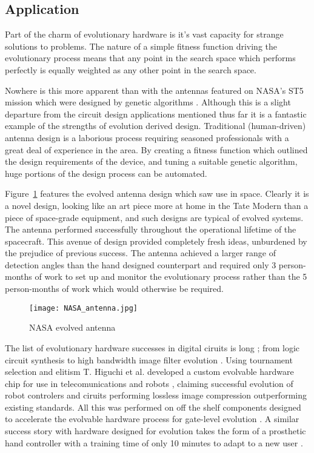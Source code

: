 \subsection{Application}

Part of the charm of evolutionary hardware is it's vast capacity for strange
solutions
to problems. The nature of a simple fitness function driving the evolutionary
process means that any point in the search space which performs perfectly is
equally weighted as any other point in the search space.

Nowhere is this more apparent than with the antennas featured on NASA's ST5 mission
which were designed by genetic algorithms \cite{Antenna}. Although
this is a slight departure from the circuit design applications mentioned thus
far it is a fantastic example of the strengths of evolution derived design.
Traditional (human-driven) antenna design is a laborious process requiring
seasoned professionals with a great deal of experience in the area. By creating
a fitness function which outlined the design requirements of the device, and
tuning a suitable genetic algorithm, huge portions of the design process can
be automated.

Figure~\ref{fig:antenna} features the evolved antenna design which
saw use in space. Clearly it is a novel design, looking like an art piece
more at home in the Tate Modern than a piece of space-grade equipment, and such
designs are typical of evolved systems. The antenna performed successfully
throughout the operational lifetime of the spacecraft. This avenue of design
provided completely fresh ideas, unburdened by the prejudice of previous
success. The antenna achieved a larger range of detection angles than the
hand designed counterpart and required only 3 person-months of work to set up and
monitor the evolutionary process rather than the 5 person-months of work which
would otherwise be required.

\begin{figure}
	\centering
	\texttt{[image: NASA\_antenna.jpg]}
	\caption{NASA evolved antenna \cite{Antenna}}
	\label{fig:antenna}
\end{figure}

The list of evolutionary hardware successes in digital ciruits is long \cite{Sekanina};
from logic circuit synthesis \cite{Vasicek2011} to high bandwidth image filter
evolution \cite{10.1007/3-540-46004-7_26}\cite{HybridFilter}.
Using tournament selection and elitism T. Higuchi et al.
developed a custom evolvable hardware chip for use in telecomunications and robots \cite{HiguchiRW},
claiming successful evolution of robot controlers and ciruits performing lossless image
compression outperforming existing standards. All this was performed on off
the shelf components designed to accelerate the evolvable hardware process
for gate-level evolution \cite{HiguchiRW}. A similar success story with hardware
designed for evolution takes the form of a prosthetic hand controller with
a training time of only 10 minutes to adapt to a new user \cite{Kajitani1999AnEH}.

